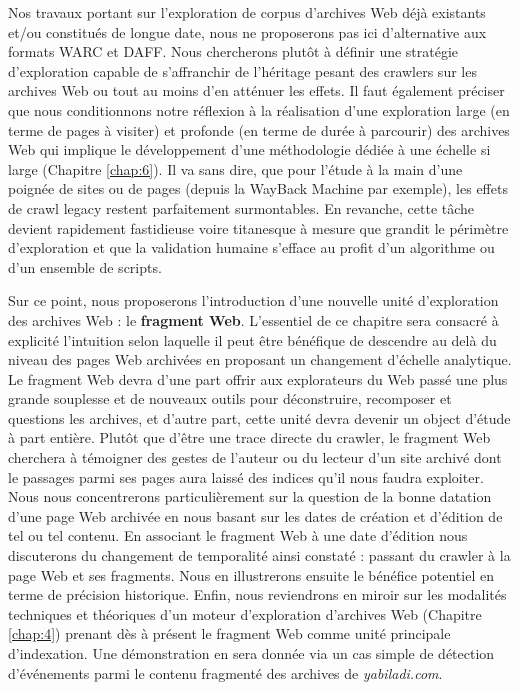 \documentclass[symmetric,justified,marginals=raggedouter]{tufte-book}
\begin{document}
Nos travaux portant sur l'exploration de corpus d'archives Web déjà existants et/ou constitués de longue date, nous ne proposerons pas ici d'alternative aux formats WARC et DAFF. Nous chercherons plutôt à définir une stratégie d'exploration capable de s'affranchir de l'héritage pesant des crawlers sur les archives Web ou tout au moins d'en atténuer les effets. Il faut également préciser que nous conditionnons notre réflexion à la réalisation d'une exploration large (en terme de pages à visiter) et profonde (en terme de durée à parcourir) des archives Web qui implique le développement d'une méthodologie dédiée à une échelle si large (Chapitre \ref{chap:6}). Il va sans dire, que pour l'étude à la main d'une poignée de sites ou de pages (depuis la WayBack Machine par exemple), les effets de crawl legacy restent parfaitement surmontables. En revanche, cette tâche devient rapidement fastidieuse voire titanesque à mesure que grandit le périmètre d'exploration et que la validation humaine s'efface au profit d'un algorithme ou d'un ensemble de scripts.  

Sur ce point, nous proposerons l'introduction d'une nouvelle unité d'exploration des archives Web : le \textbf{fragment Web}. L'essentiel de ce chapitre sera consacré à explicité l'intuition selon laquelle il peut être bénéfique de descendre au delà du niveau des pages Web archivées en proposant un changement d'échelle analytique. Le fragment Web devra d'une part offrir aux explorateurs du Web passé une plus grande souplesse et de nouveaux outils pour déconstruire, recomposer et questions les archives, et d'autre part, cette unité devra devenir un object d'étude à part entière. Plutôt que d'être une trace directe du crawler, le fragment Web cherchera à témoigner des gestes de l'auteur ou du lecteur d'un site archivé dont le passages parmi ses pages aura laissé des indices qu'il nous faudra exploiter. Nous nous concentrerons particulièrement sur la question de la bonne datation d'une page Web archivée en nous basant sur les dates de création et d'édition de tel ou tel contenu. En associant le fragment Web à une date d'édition nous discuterons du changement de temporalité ainsi constaté : passant du crawler à la page Web et ses fragments. Nous en illustrerons ensuite le bénéfice potentiel en terme de précision historique. Enfin, nous reviendrons en miroir sur les modalités techniques et théoriques d'un moteur d'exploration d'archives Web (Chapitre \ref{chap:4}) prenant dès à présent le fragment Web comme unité principale d'indexation. Une démonstration en sera donnée via un cas simple de détection d'événements parmi le contenu fragmenté des archives de \textit{yabiladi.com}.  
\end{document}
